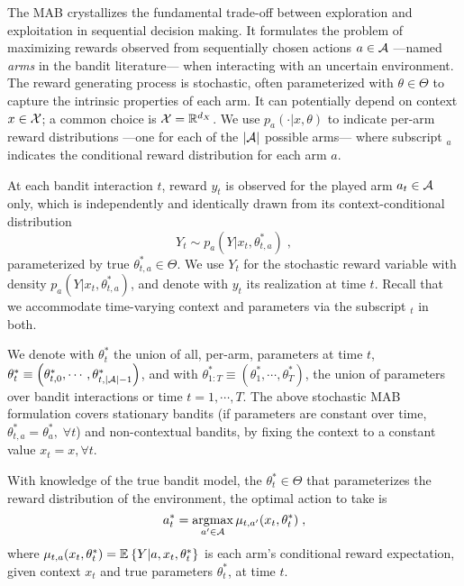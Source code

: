 
The MAB crystallizes the fundamental trade-off between exploration and exploitation in sequential decision making.
It formulates the problem of maximizing rewards observed from sequentially chosen actions $a\in\mathcal{A}$
---named \textit{arms} in the bandit literature---
when interacting with an uncertain environment.
%
The reward generating process is stochastic,
often parameterized with $\theta \in \Theta$
to capture the intrinsic properties of each arm.
It can potentially depend on context $x\in \mathcal{X}$; \eg a common choice is $\mathcal{X}={\mathbb R}^{d_X}$.
We use $p_{a}(\cdot |x,\theta)$ to indicate
per-arm reward distributions ---one for each of the $|\mathcal{A}|$ possible arms---
where subscript $_a$ indicates the conditional reward distribution for each arm $a$.

At each bandit interaction $t$, reward $y_t$ is observed for the played arm $a_t\in\mathcal{A}$ only,
which is independently and identically drawn from its context-conditional distribution
\begin{equation}
Y_t\sim p_{a}(Y|x_t,\theta_{t,a}^*) \;,
\end{equation}
parameterized by true $\theta_{t,a}^* \in \Theta$.
We use $Y_t$ for the stochastic reward variable with density $p_{a}(Y|x_t,\theta_{t,a}^*)$,
and denote with $y_t$ its realization at time $t$.
Recall that we accommodate time-varying context and parameters via the subscript $_t$ in both.

We denote with $\theta_t^*$ the union of all, per-arm, parameters at time $t$,
$\theta_t^* \equiv \left(\theta_{t,0}^*, \cdots, \theta_{t,|\mathcal{A}|-1}^* \right)$,
and with $\theta_{1:T}^*\equiv \left( \theta_{1}^*, \cdots, \theta_{T}^* \right)$,
the union of parameters over bandit interactions or time $t=1,\cdots,T$.
%
The above stochastic MAB formulation covers stationary bandits
(if parameters are constant over time, \ie $\theta_{t,a}^*=\theta_a^*, \; \forall t$)
and non-contextual bandits, by fixing the context to a constant value $x_t=x, \forall t$.

With knowledge of the true bandit model,
\ie the $\theta_t^* \in \Theta$
that parameterizes the reward distribution of the environment,
the optimal action to take is
\begin{equation}
a_t^* = \mathop{\mathrm{argmax}}_{a^\prime \in \mathcal{A}} \mu_{t,a^\prime}(x_t,\theta_t^*) \;,
\end{equation}
where $\mu_{t,a}(x_t,\theta_t^*)=\mathbb{E}_{}\left\{ Y|a,x_t,\theta_t^* \right\}$ is each arm's conditional reward expectation,
given context $x_t$ and true parameters $\theta_t^*$, at time $t$.

